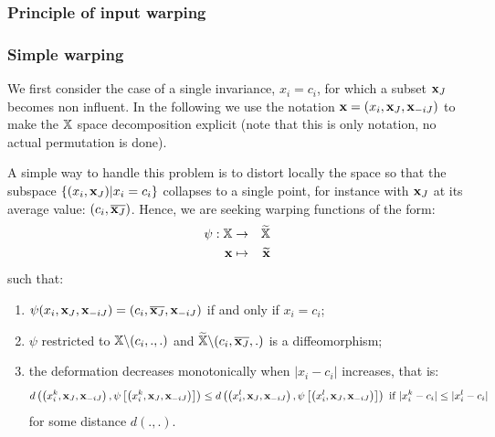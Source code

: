 \subsubsection{Principle of input warping}

\cite{snoek2014input,marmin2018warped}


\subsubsection{Simple warping}
We first consider the case of a single invariance, $x_i = c_i$, for which a subset $\mathbf{x}_J$ becomes non influent. 
In the following we use the notation $\mathbf{x} = (x_i, \mathbf{x}_J, \mathbf{x}_{-iJ})$ to make the $\mathbb{X}$ space decomposition explicit (note that this is only notation, 
no actual permutation is done).

A simple way to handle this problem is to distort locally the space so that the subspace $\{(x_i, \mathbf{x}_J) | x_i = c_i\}$ collapses to a single point,
for instance with $\mathbf{x}_J$ at its average value: $(c_i, \overline{\mathbf{x}_J})$.
Hence, we are seeking warping functions of the form: 
\begin{eqnarray*}
 \psi: \mathbb{X} &\rightarrow& \widetilde{\mathbb{X}} \\
 \mathbf{x} & \mapsto &  \widetilde{\mathbf{x}}
\end{eqnarray*}
such that:
\begin{enumerate}
 \item $\psi(x_i, \mathbf{x}_J, \mathbf{x}_{-iJ}) = (c_i, \overline{\mathbf{x}_J}, \mathbf{x}_{-iJ})$ if and only if $x_i=c_i$;%
 \item $\psi$ restricted to $\mathbb{X} \backslash (c_i,.,.)$ and $\widetilde{\mathbb{X}} \backslash (c_i,\overline{\mathbf{x}_J},.)$ is a diffeomorphism;
 \item the deformation decreases monotonically when $\lvert x_i - c_i\rvert$ increases, that is: 
 $$d \left( \left(x_i^{k}, \mathbf{x}_J, \mathbf{x}_{-iJ} \right), \psi\left[\left(x_i^{k}, \mathbf{x}_J, \mathbf{x}_{-iJ}\right)\right] \right)\leq d \left( \left(x_i^{l}, \mathbf{x}_J, \mathbf{x}_{-iJ} \right), 
 \psi\left[\left(x_i^{l}, \mathbf{x}_J, \mathbf{x}_{-iJ}\right)\right]\right) \text{ if }\lvert x_i^{k}- c_i\rvert \leq \lvert x_i^{l}- c_i\rvert $$
for some distance $d(.,.)$.
\end{enumerate}

